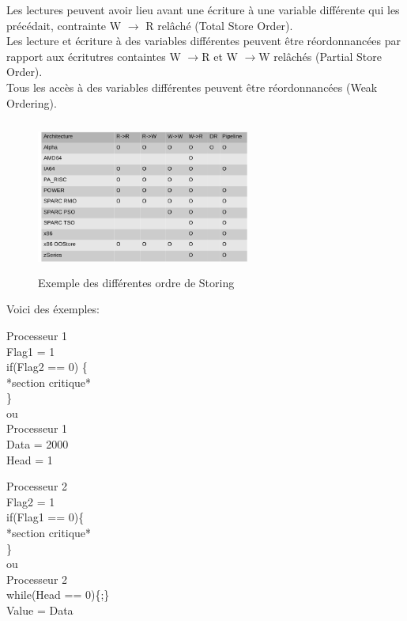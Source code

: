\documentclass[oneside]{book}
\begin{document}
Les lectures peuvent avoir lieu avant une écriture à une variable différente qui les précédait, contrainte W $\rightarrow$ R relâché (Total Store Order). \\

Les lecture et écriture à des variables différentes peuvent être réordonnancées par rapport aux écritutres containtes W $\rightarrow$R et W $\rightarrow$W relâchés (Partial Store Order).\\

Tous les accès à des variables différentes peuvent être réordonnancées (Weak Ordering).

\begin{figure}[!ht]
\centering
\includegraphics[width=7cm, height=5cm, keepaspectratio]{StoreOrder.png}
\caption{Exemple des différentes ordre de Storing}
\label{fig:StoreOrder}

\end{figure}
\newpage
Voici des éxemples:
\begin{multicols}{2}
Processeur 1\\

Flag1 = 1\\
if(Flag2 == 0) \{\\
*section critique*\\
\}\\

ou \\

Processeur 1\\
Data = 2000\\
Head = 1
\columnbreak

Processeur 2 \\

Flag2 = 1\\
if(Flag1 == 0)\{\\
*section critique*\\
\}\\

ou \\

Processeur 2\\
while(Head == 0)\{;\}\\
Value = Data\\

\end{multicols}
\end{document}
